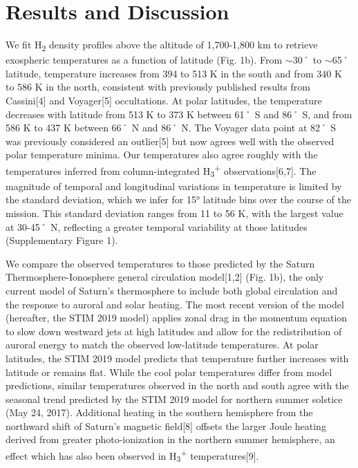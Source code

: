 \section{Results and Discussion}

We fit H\textsubscript{2} density profiles above the altitude of 1,700-1,800 km to retrieve exospheric temperatures as a function of latitude (Fig. 1b). From $\sim$30˚ to $\sim$65˚ latitude, temperature increases from 394 to 513 K in the south and from 340 K to 586 K in the north, consistent with previously published results from Cassini[4] and Voyager[5] occultations. At polar latitudes, the temperature decreases with latitude from 513 K to 373 K between 61˚ S and 86˚ S, and from 586 K to 437 K between 66˚ N and 86˚ N. The Voyager data point at 82˚ S was previously considered an outlier[5] but now agrees well with the observed polar temperature minima. Our temperatures also agree roughly with the temperatures inferred from column-integrated H\textsubscript{3}\textsuperscript{+} observations[6,7]. The magnitude of temporal and longitudinal variations in temperature is limited by the standard deviation, which we infer for 15° latitude bins over the course of the mission. This standard deviation ranges from 11 to 56 K, with the largest value at 30-45˚ N, reflecting a greater temporal variability at those latitudes (Supplementary Figure 1).

We compare the observed temperatures to those predicted by the Saturn Thermosphere-Ionosphere general circulation model[1,2] (Fig. 1b), the only current model of Saturn’s thermosphere to include both global circulation and the response to auroral and solar heating. The most recent version of the model (hereafter, the STIM 2019 model) applies zonal drag in the momentum equation to slow down westward jets at high latitudes and allow for the redistribution of auroral energy to match the observed low-latitude temperatures. At polar latitudes, the STIM 2019 model predicts that temperature further increases with latitude or remains flat. While the cool polar temperatures differ from model predictions, similar temperatures observed in the north and south agree with the seasonal trend predicted by the STIM 2019 model for northern summer solstice (May 24, 2017). Additional heating in the southern hemisphere from the northward shift of Saturn’s magnetic field[8] offsets the larger Joule heating derived from greater photo-ionization in the northern summer hemisphere, an effect which has also been observed in H\textsubscript{3}\textsuperscript{+} temperatures[9].

